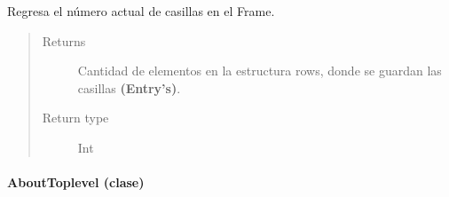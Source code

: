 \documentclass[letterpaper,10pt,english]{sphinxmanual}
\begin{document}
\begin{fulllineitems}

\begin{fulllineitems}
\label{View/Additional/MenuInternalOption/InternalOptionTab/ExpressionFrame:View.Additional.MenuInternalOption.InternalOptionTab.ExpressionFrame.ExpressionFrame.get_current_elements}
Regresa el número actual de casillas en el Frame.
\begin{quote}\begin{description}
\item[{Returns}] \leavevmode
Cantidad de elementos en la estructura rows, donde se guardan las casillas \textbf{(Entry's)}.

\item[{Return type}] \leavevmode
Int

\end{description}\end{quote}

\end{fulllineitems}


\end{fulllineitems}



\paragraph{AboutToplevel (clase)}
\label{View/Additional/MenuInternalOption/AboutToplevel:abouttoplevel-clase}\label{View/Additional/MenuInternalOption/AboutToplevel::doc}\label{View/Additional/MenuInternalOption/AboutToplevel:module-View.Additional.MenuInternalOption.AboutToplevel}
\end{document}
